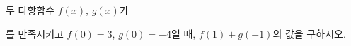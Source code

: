 두 다항함수 $f(x)$, $g(x)$가 \par\smallskip{}\par\smallskip\noindent 를 만족시키고 $f(0)=3$, $g(0)=-4$일 때, $f(1)+g(-1)$의 값을 구하시오.
